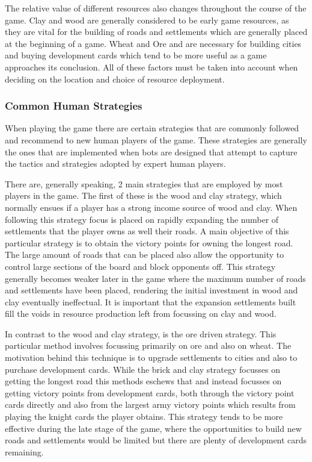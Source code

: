 \documentclass[]{article}
\begin{document}
\par The relative value of different resources also changes throughout the course of the game. Clay and wood are generally considered to be early game resources, as they are vital for the building of roads and settlements which are generally placed at the beginning of a game. Wheat and Ore and are necessary for building cities and buying development cards which tend to be more useful as a game approaches its conclusion. All of these factors must be taken into account when deciding on the location and choice of resource deployment.

\subsubsection{Common Human Strategies}
When playing the game there are certain strategies that are commonly followed and recommend to new human players of the game. These strategies are generally the ones that are implemented when bots are designed that attempt to capture the tactics and strategies adopted by expert human players.

\par There are, generally speaking, 2 main strategies that are employed by most players in the game. The first of these is the wood and clay strategy, which normally ensues if a player has a strong income source of wood and clay. When following this strategy focus is placed on rapidly expanding the number of settlements that the player owns as well their roads. A main objective of this particular strategy is to obtain the victory points for owning the longest road. The large amount of roads that can be placed also allow the opportunity to control large sections of the board and block opponents off. This strategy generally becomes weaker later in the game where the maximum number of roads and settlements have been placed, rendering the initial investment in wood and clay eventually ineffectual. It is important that the expansion settlements built fill the voids in resource production left from focussing on clay and wood.

\par In contrast to the wood and clay strategy, is the ore driven strategy. This particular method involves focussing primarily on ore and also on wheat. The motivation behind this technique is to upgrade settlements to cities and also to purchase development cards. While the brick and clay strategy focusses on getting the longest road this methods eschews that and instead focusses on getting victory points from development cards, both through the victory point cards directly and also from the largest army victory points which results from playing the knight cards the player obtains. This strategy tends to be more effective during the late stage of the game, where the opportunities to build new roads and settlements would be limited but there are plenty of development cards remaining.
\end{document}
